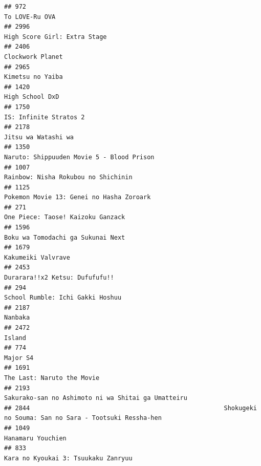 \documentclass[
]{article}
\begin{document}
\begin{verbatim}
## 972                                                                                             To LOVE-Ru OVA
## 2996                                                                              High Score Girl: Extra Stage
## 2406                                                                                          Clockwork Planet
## 2965                                                                                          Kimetsu no Yaiba
## 1420                                                                                           High School DxD
## 1750                                                                                    IS: Infinite Stratos 2
## 2178                                                                                       Jitsu wa Watashi wa
## 1350                                                                 Naruto: Shippuuden Movie 5 - Blood Prison
## 1007                                                                       Rainbow: Nisha Rokubou no Shichinin
## 1125                                                                  Pokemon Movie 13: Genei no Hasha Zoroark
## 271                                                                          One Piece: Taose! Kaizoku Ganzack
## 1596                                                                         Boku wa Tomodachi ga Sukunai Next
## 1679                                                                                        Kakumeiki Valvrave
## 2453                                                                            Durarara!!x2 Ketsu: Dufufufu!!
## 294                                                                           School Rumble: Ichi Gakki Hoshuu
## 2187                                                                                                   Nanbaka
## 2472                                                                                                    Island
## 774                                                                                                   Major S4
## 1691                                                                                The Last: Naruto the Movie
## 2193                                                        Sakurako-san no Ashimoto ni wa Shitai ga Umatteiru
## 2844                                                     Shokugeki no Souma: San no Sara - Tootsuki Ressha-hen
## 1049                                                                                         Hanamaru Youchien
## 833                                                                        Kara no Kyoukai 3: Tsuukaku Zanryuu

\end{verbatim}
\end{document}
